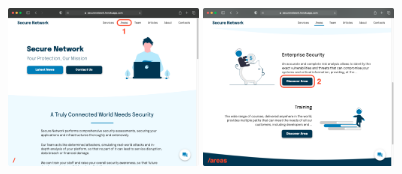 \documentclass[12pt]{report}
\begin{document}
\begin{figure}[H]
	\centering
	\includegraphics[width=0.45\textwidth]{scenarios/1/1.png}
	\includegraphics[width=0.45\textwidth]{scenarios/1/2.png}
\end{figure}
\end{document}
